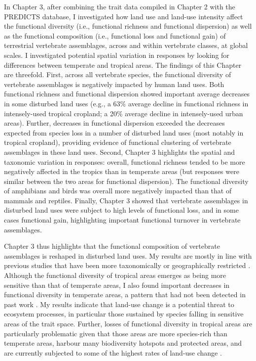 In Chapter 3, after combining the trait data compiled in Chapter 2 with the PREDICTS database, I investigated how land use and land-use intensity affect the functional diversity (i.e., functional richness and functional dispersion) as well as the functional composition (i.e., functional loss and functional gain) of terrestrial vertebrate assemblages, across and within vertebrate classes, at global scales. I investigated potential spatial variation in responses by looking for differences between temperate and tropical areas. The findings of this Chapter are threefold. First, across all vertebrate species, the functional diversity of vertebrate assemblages is negatively impacted by human land uses. Both functional richness and functional dispersion showed important average decreases in some disturbed land uses (e.g., a 63\% average decline in functional richness in intensely-used tropical cropland; a 20\% average decline in intensely-used urban areas). Further, decreases in functional dispersion exceeded the decreases expected from species loss in a number of disturbed land uses (most notably in tropical cropland), providing evidence of functional clustering of vertebrate assemblages in these land uses. Second, Chapter 3 highlights the spatial and taxonomic variation in responses: overall, functional richness tended to be more negatively affected in the tropics than in temperate areas (but responses were similar between the two areas for functional dispersion). The functional diversity of amphibians and birds was overall more negatively impacted than that of mammals and reptiles. Finally, Chapter 3 showed that vertebrate assemblages in disturbed land uses were subject to high levels of functional loss, and in some cases functional gain, highlighting important functional turnover in vertebrate assemblages. 

Chapter 3 thus highlights that the functional composition of vertebrate assemblages is reshaped in disturbed land uses. My results are mostly in line with previous studies that have been more taxonomically or geographically restricted \citep{Flynn2009, Matuoka2020, Marcacci2021}. Although the functional diversity of tropical areas emerges as being more sensitive than that of temperate areas, I also found important decreases in functional diversity in temperate areas, a pattern that had not been detected in past work \citep{Matuoka2020}. My results indicate that land-use change is a potential threat to ecosystem processes, in particular those sustained by species falling in sensitive areas of the trait space. Further, losses of functional diversity in tropical areas are particularly problematic given that those areas are more species-rich than temperate areas, harbour many biodiversity hotspots and protected areas, and are currently subjected to some of the highest rates of land-use change \citep{Laurance2012, Hansen2013, Spracklen2015}. 

